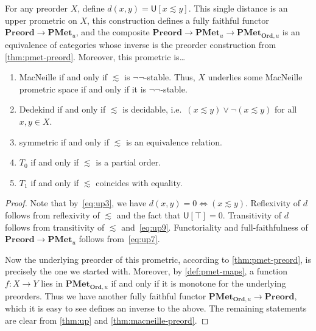 \documentclass{article}
\def\U[#1]{\mathsf{U}[#1]}
\def\leapx{\lesssim}
\def\nn{\ensuremath{\neg\neg}}
\def\PMetu{\mathbf{PMet}_u}
\def\PMetOrdu{\mathbf{PMet}_{\mathbf{Ord},u}}
\def\Preord{\mathbf{Preord}}
\begin{document}
\begin{thm}\label{thm:preord-pmetl}
  For any preorder $X$, define $d(x,y) = \U[x\leapx y]$.
  This single distance is an upper prometric on $X$, this construction defines a fully faithful functor $\Preord \to \PMetu$, and the composite $\Preord \to \PMetu \to \PMetOrdu$ is an equivalence of categories whose inverse is the preorder construction from \cref{thm:pmet-preord}.
  Moreover, this prometric is\dots
  \begin{enumerate}
  \item MacNeille if and only if $\leapx$ is \nn-stable.
    Thus, $X$ underlies some MacNeille prometric space if and only if it is \nn-stable.
  \item Dedekind if and only if $\leapx$ is decidable, i.e.\ $(x\leapx y) \lor \neg(x\leapx y)$ for all $x,y\in X$.
  \item symmetric if and only if $\leapx$ is an equivalence relation.
  \item $T_0$ if and only if $\leapx$ is a partial order.
  \item $T_1$ if and only if $\leapx$ coincides with equality.
  \end{enumerate}
\end{thm}
\begin{proof}
  Note that by~\eqref{eq:up3}, we have $d(x,y)=0 \iff (x\leapx y)$.
  Reflexivity of $d$ follows from reflexivity of $\leapx$ and the fact that $\U[\top]=0$.
  Transitivity of $d$ follows from transitivity of $\leapx$ and~\eqref{eq:up9}.
  Functoriality and full-faithfulness of $\Preord \to \PMetu$ follows from~\eqref{eq:up7}.
  
  Now the underlying preorder of this prometric, according to \cref{thm:pmet-preord}, is precisely the one we started with.
  Moreover, by \cref{def:pmet-maps}, a function $f:X\to Y$ lies in $\PMetOrdu$ if and only if it is monotone for the underlying preorders.
  Thus we have another fully faithful functor $\PMetOrdu \to \Preord$, which it is easy to see defines an inverse to the above.
  The remaining statements are clear from \cref{thm:up} and \cref{thm:macneille-preord}.
\end{proof}
\end{document}
